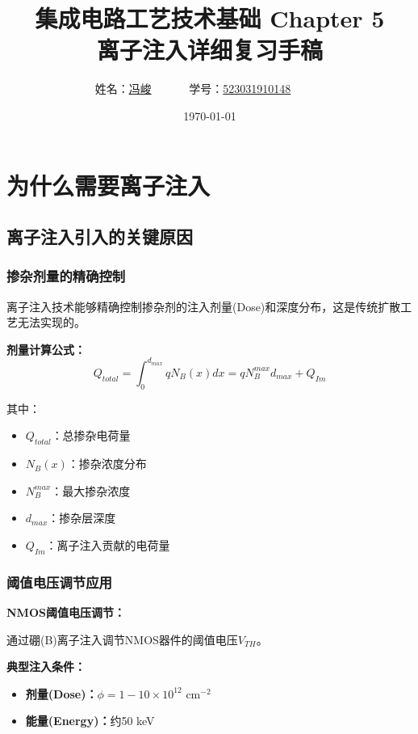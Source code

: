 \documentclass[UTF8,12pt,a4paper]{ctexart}
\title{集成电路工艺技术基础 Chapter 5\\离子注入详细复习手稿}
\author{
姓名：\underline{冯峻}~~~~~~
学号：\underline{523031910148}~~~~~~}
\date{\today}
\begin{document}
\fancyfoot[C]{\thepage}

\maketitle
\tableofcontents
\newpage  %

\section{为什么需要离子注入}

\subsection{离子注入引入的关键原因}

\subsubsection{掺杂剂量的精确控制}

离子注入技术能够精确控制掺杂剂的注入剂量(Dose)和深度分布，这是传统扩散工艺无法实现的。

\textbf{剂量计算公式：}
\begin{equation}
Q_{total} = \int_0^{d_{max}} q N_B(x) dx = q N_B^{max} d_{max} + Q_{Im}
\end{equation}

其中：
\begin{itemize}
    \item $Q_{total}$：总掺杂电荷量
    \item $N_B(x)$：掺杂浓度分布
    \item $N_B^{max}$：最大掺杂浓度
    \item $d_{max}$：掺杂层深度
    \item $Q_{Im}$：离子注入贡献的电荷量
\end{itemize}

\subsubsection{阈值电压调节应用}

\textbf{NMOS阈值电压调节：}

通过硼(B)离子注入调节NMOS器件的阈值电压$V_{TH}$。

\textbf{典型注入条件：}
\begin{itemize}
    \item \textbf{剂量(Dose)：}$\phi = 1-10 \times 10^{12}$ cm$^{-2}$
    \item \textbf{能量(Energy)：}约50 keV
\end{itemize}
\end{document}
